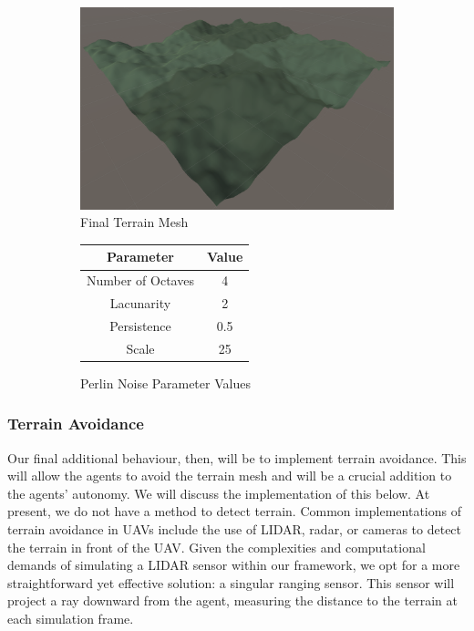 \documentclass[12pt]{article}
\begin{document}
\begin{figure}
    \centering
    \begin{subfigure}{0.4\textwidth}
        \centering
        \includegraphics[width=\linewidth]{lacunarity2.png}
        \caption{Final Terrain Mesh}
        \label{fig:final}
    \end{subfigure}
    \hfill
    \begin{subfigure}{0.4\textwidth}
        \centering
        \begin{tabular}{|c|c|}
            \hline
            Parameter & Value \\
            \hline
            Number of Octaves & 4 \\
            \hline
            Lacunarity & 2 \\
            \hline
            Persistence & 0.5 \\
            \hline
            Scale & 25 \\
            \hline
        \end{tabular}
        \caption{Perlin Noise Parameter Values}
        \label{tab:parameter-values}
    \end{subfigure}
    \caption{}
    \label{fig:parameter-values-lacunarity2}
\end{figure}

\subsubsection{Terrain Avoidance}
\label{sec:terrain-avoidance}
Our final additional behaviour, then, will be to implement terrain avoidance. This will allow the agents to avoid the terrain mesh and will be a crucial addition to the agents' autonomy. We will discuss the implementation of this below. At present, we do not have a method to detect terrain. Common implementations of terrain avoidance in UAVs include the use of LIDAR, radar, or cameras to detect the terrain in front of the UAV\cite{Petrillo,burwell_2019}. Given the complexities and computational demands of simulating a LIDAR sensor within our framework, we opt for a more straightforward yet effective solution: a singular ranging sensor. This sensor will project a ray downward from the agent, measuring the distance to the terrain at each simulation frame.
\end{document}
